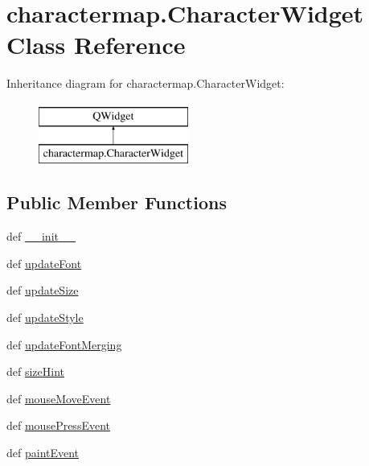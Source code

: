 \hypertarget{classcharactermap_1_1CharacterWidget}{}\section{charactermap.\+Character\+Widget Class Reference}
\label{classcharactermap_1_1CharacterWidget}
Inheritance diagram for charactermap.\+Character\+Widget\+:\begin{figure}[H]
\begin{center}
\leavevmode
\includegraphics[height=2.000000cm]{classcharactermap_1_1CharacterWidget}
\end{center}
\end{figure}
\subsection*{Public Member Functions}
\begin{DoxyCompactItemize}
\item 
def \hyperlink{classcharactermap_1_1CharacterWidget_a1d8fdc158f73c2c9406582b4168336ad}{\+\_\+\+\_\+init\+\_\+\+\_\+}
\item 
def \hyperlink{classcharactermap_1_1CharacterWidget_a71bb5b2a6f7e77f9002dff526f754a5b}{update\+Font}
\item 
def \hyperlink{classcharactermap_1_1CharacterWidget_a9897e36076d60e61d7e68929204a4c9a}{update\+Size}
\item 
def \hyperlink{classcharactermap_1_1CharacterWidget_ada1d3897c4f8c40c0cf0a22fcd604ea5}{update\+Style}
\item 
def \hyperlink{classcharactermap_1_1CharacterWidget_a91fbe7f3d0b7ba250e05802435deeef4}{update\+Font\+Merging}
\item 
def \hyperlink{classcharactermap_1_1CharacterWidget_ac85984666f5f93debcac10a7b69a78f4}{size\+Hint}
\item 
def \hyperlink{classcharactermap_1_1CharacterWidget_ab9a32931d9a55ca31108fa5aa8196125}{mouse\+Move\+Event}
\item 
def \hyperlink{classcharactermap_1_1CharacterWidget_abbf7fe68a20046dcac0ad0e17dad26b5}{mouse\+Press\+Event}
\item 
def \hyperlink{classcharactermap_1_1CharacterWidget_ae701fe7007018e2335e1bbbce32c2947}{paint\+Event}
\end{DoxyCompactItemize}

